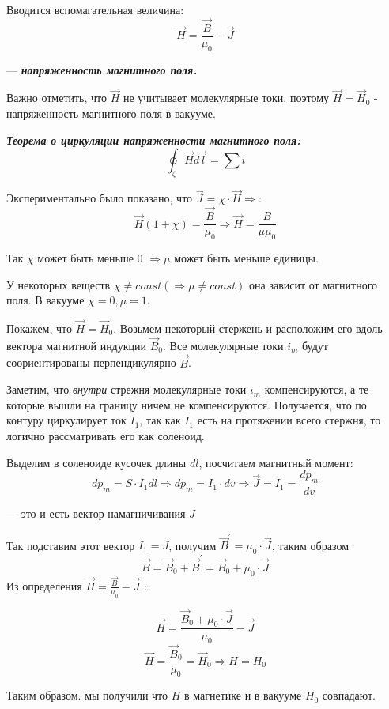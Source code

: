 \documentclass[../main.tex]{subfiles}
\begin{document}
Вводится вспомагательная величина:
\[\vec H = \frac{\vec B}{\mu_0} - \vec J\]
\begin{center}
    --- \textit{\textbf{напряженность магнитного поля.}}

    Важно отметить, что $\vec H$ не учитывает молекулярные токи, поэтому $\vec H = \vec H_0$ - напряженность магнитного поля в вакууме.
\end{center}

\textit{\textbf{Теорема о циркуляции напряженности магнитного поля:}}
\[\oint_{\zeta} \vec H d \vec l = \sum i\]

Экспериментально было показано, что $\vec J = \chi \cdot \vec H \Rightarrow$:
\[\vec H(1+ \chi) = \frac{\vec B}{\mu_0} \Rightarrow \vec H = \frac{B}{\mu \mu_0}\]

Так $\chi$ может быть меньше 0 $\Rightarrow \mu $ может быть меньше единицы.

У некоторых веществ $\chi \neq const (\Rightarrow \mu \neq const )$ она зависит от магнитного поля.
В вакууме $\chi = 0, \mu = 1$.

Покажем, что $\vec H = \vec H_0$. Возьмем некоторый стержень и расположим его вдоль вектора магнитной индукции $\vec B_0$. Все молекулярные токи $i_m$ будут соориентированы перпендикулярно $\vec B$.

Заметим, что \textit{внутри} стрежня молекулярные токи $i_m$ компенсируются, а те которые вышли на границу ничем не компенсируются. Получается, что по контуру
циркулирует ток $I_1$, так как $I_1$ есть на протяжении всего стержня, то логично рассматривать его как соленоид.

\vspace{5px}

Выделим в соленоиде кусочек длины $dl$, посчитаем магнитный момент:
\[dp_m = S \cdot I_1 dl \Rightarrow dp_m = I_1 \cdot dv \Rightarrow \vec J = I_1 = \frac{dp_m}{dv}\]
\begin{center}
    --- это и есть вектор намагничивания $J$
\end{center}
Так подставим этот вектор $I_1 = J$, получим $\vec B^{\prime} = \mu_0 \cdot \vec J$, таким образом
\[\vec B = \vec B_0 + \vec B^{\prime} = \vec B_0 + \mu_0 \cdot \vec J\]
Из определения $\vec H = \frac{\vec B}{\mu_0} - \vec J$ :

\[\vec H = \frac{\vec B_0 + \mu_0 \cdot \vec J }{\mu_0} - \vec J\]
\[\vec H = \frac{\vec B_0}{\mu_0} = \vec H_0 \Rightarrow H = H_0\]

Таким образом. мы получили что $H$ в магнетике и в вакууме $H_0$ совпадают.
\end{document}
